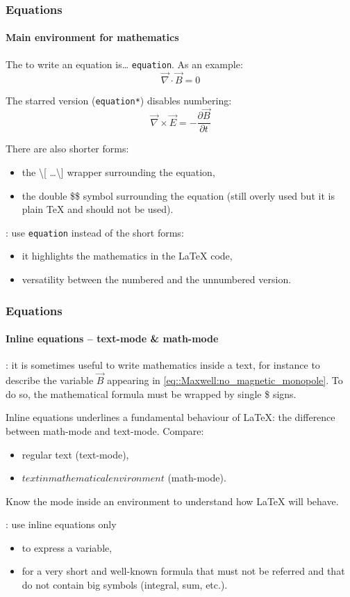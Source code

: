 \documentclass[11pt]{beamer}
\begin{document}
\begin{frame}
	\frametitle{Equations}
	\framesubtitle{Main environment for mathematics}
	
	The  to write an equation is\dots{} \alert{\texttt{equation}}.
	As an example:
	\begin{equation}
		\vec{\nabla}\cdot\vec{B}=0
		\label{eq::Maxwell:no_magnetic_monopole}
	\end{equation}
	
	The starred version (\texttt{equation*}) disables numbering:
	\begin{equation*}
		\vec{\nabla}\times\vec{E}=-\frac{\partial\vec{B}}{\partial t}
	\end{equation*}
	
	There are also shorter forms:
	\begin{itemize}
		\item the \textbackslash{}[ \ldots \textbackslash{}] wrapper surrounding the equation,
		\item the double \$\$ symbol surrounding the equation (still overly used but it is plain \TeX{} and should not be used).
	\end{itemize}

	: use \texttt{equation} instead of the short forms:
	\begin{itemize}
		\item it highlights the mathematics in the \LaTeX{} code,
		\item versatility between the numbered and the unnumbered version.
	\end{itemize}
\end{frame}


\begin{frame}
	\frametitle{Equations}
	\framesubtitle{Inline equations -- text-mode \& math-mode}
	
	: it is sometimes useful to write mathematics inside a text, for instance to describe the variable $\vec{B}$ appearing in \cref{eq::Maxwell:no_magnetic_monopole}.
	To do so, the mathematical formula must be wrapped by single \$ signs.
	
	Inline equations underlines a fundamental behaviour of \LaTeX{}: the difference between \alert{math-mode and text-mode}.
	Compare:
	\begin{itemize}
		\item regular text (text-mode),
		\item $text in mathematical environment$ (math-mode).
	\end{itemize}
	Know the mode inside an environment to understand how \LaTeX{} will behave.
	
	: use inline equations only
	\begin{itemize}
		\item to express a variable,
		\item for a very short and well-known formula that must not be referred and that do not contain big symbols (integral, sum, etc.).
	\end{itemize}
\end{frame}
\end{document}
